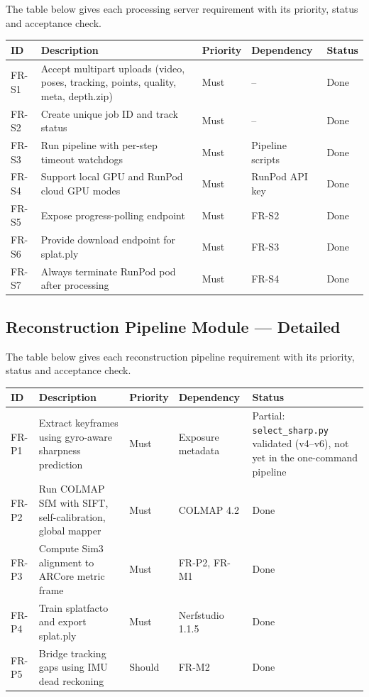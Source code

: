 The table below gives each processing server requirement with its priority, status and acceptance check.

\begin{longtable}{p{}p{}p{}p{}p{}}
\toprule
\textbf{ID} & \textbf{Description} & \textbf{Priority} & \textbf{Dependency} & \textbf{Status} \\
\midrule
FR-S1 & Accept multipart uploads (video, poses, tracking, points, quality, meta, depth.zip) & Must & -- & Done \\
FR-S2 & Create unique job ID and track status & Must & -- & Done \\
FR-S3 & Run pipeline with per-step timeout watchdogs & Must & Pipeline scripts & Done \\
FR-S4 & Support local GPU and RunPod cloud GPU modes & Must & RunPod API key & Done \\
FR-S5 & Expose progress-polling endpoint & Must & FR-S2 & Done \\
FR-S6 & Provide download endpoint for splat.ply & Must & FR-S3 & Done \\
FR-S7 & Always terminate RunPod pod after processing & Must & FR-S4 & Done \\
\bottomrule
\end{longtable}

\subsection{Reconstruction Pipeline Module --- Detailed}

The table below gives each reconstruction pipeline requirement with its priority, status and acceptance check.

\begin{longtable}{p{}p{}p{}p{}p{}}
\toprule
\textbf{ID} & \textbf{Description} & \textbf{Priority} & \textbf{Dependency} & \textbf{Status} \\
\midrule
FR-P1 & Extract keyframes using gyro-aware sharpness prediction & Must & Exposure metadata & Partial: \texttt{select\_sharp.py} validated (v4--v6), not yet in the one-command pipeline \\
FR-P2 & Run COLMAP SfM with SIFT, self-calibration, global mapper & Must & COLMAP 4.2 & Done \\
FR-P3 & Compute Sim3 alignment to ARCore metric frame & Must & FR-P2, FR-M1 & Done \\
FR-P4 & Train splatfacto and export splat.ply & Must & Nerfstudio 1.1.5 & Done \\
FR-P5 & Bridge tracking gaps using IMU dead reckoning & Should & FR-M2 & Done \\
\bottomrule
\end{longtable}

